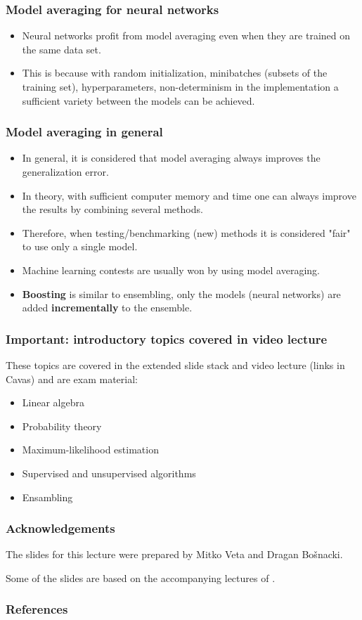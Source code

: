 \documentclass[notes]{beamer}          %
\begin{document}
\begin{frame}
\frametitle{Model averaging for neural networks}
    \begin{itemize}
        \item Neural networks profit from model averaging even when they are trained on the same data set.
        \item This is because with random initialization, minibatches (subsets of the training set), hyperparameters, non-determinism in the implementation a sufficient variety between the models can be achieved.
    \end{itemize}
\end{frame}


\begin{frame}
\frametitle{Model averaging in general}
    \begin{itemize}
        \item In general, it is considered that model averaging always improves the generalization error.
        \item In theory, with sufficient computer memory and time one can always improve the results by combining several methods.
        \item Therefore, when testing/benchmarking (new) methods it is considered "fair" to use only a single model.
        \item Machine learning contests are usually won by using model averaging.
        \item {\bf Boosting} is similar to ensembling, only the models (neural networks) are added {\bf incrementally} to the ensemble.
    \end{itemize}
\end{frame}

\fi %


\begin{frame}
\frametitle{Important: introductory topics covered in video lecture}
These topics are covered in the extended slide stack and video lecture (links in Cavas) and are exam material:
\begin{itemize}
  \item Linear algebra
  \item Probability theory
  \item Maximum-likelihood estimation
  \item Supervised and unsupervised algorithms
  \item Ensambling
\end{itemize}
\end{frame}

\begin{frame}
\frametitle{Acknowledgements}

The slides for this lecture were prepared by Mitko Veta and Dragan Bo{\v s}nacki.

Some of the slides are based on the accompanying lectures of \cite{deeplearning}.

\end{frame}


\begin{frame}
\frametitle{References}
\printbibliography
\end{frame}
\end{document}
